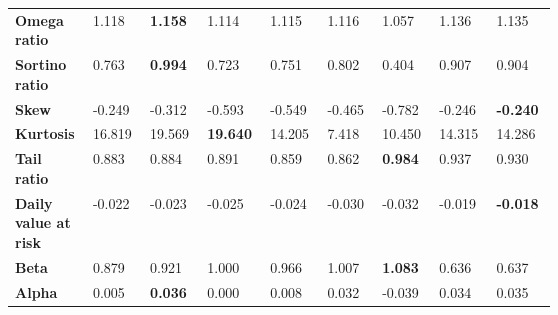 \begin{table}[ht!]
{\begin{tabular}{*{9}{|m{0.07\linewidth}|}}
                      \bfseries Omega ratio         & 1.118              & \color[HTML]{00F000} \bfseries 1.158 & 1.114                                 & 1.115            & 1.116 & 1.057 & 1.136 & 1.135 \\[0.5cm]
                      \bfseries Sortino ratio       & 0.763              & \color[HTML]{00F000} \bfseries 0.994 & 0.723                                 & 0.751            & 0.802 & 0.404 & 0.907 & 0.904 \\[0.5cm]
                      \bfseries Skew                & -0.249             & -0.312                               & -0.593                                & -0.549           & -0.465           & -0.782                               & -0.246                               & \color[HTML]{00F000} \bfseries -0.240 \\[0.5cm]
                      \bfseries Kurtosis            & 16.819             & 19.569                               & \color[HTML]{00F000} \bfseries 19.640 & 14.205           & 7.418 & 10.450 & 14.315 & 14.286 \\[0.5cm]
                      \bfseries Tail ratio          & 0.883              & 0.884                                & 0.891                                 & 0.859            & 0.862            & \color[HTML]{00F000} \bfseries 0.984 & 0.937 & 0.930 \\[0.5cm]
                      \bfseries Daily value at risk & -0.022             & -0.023                               & -0.025                                & -0.024           & -0.030           & -0.032                               & -0.019                               & \color[HTML]{00F000} \bfseries -0.018 \\[0.5cm]
                      \bfseries Beta                & 0.879              & 0.921                                & 1.000                                 & 0.966            & 1.007            & \color[HTML]{00F000} \bfseries 1.083 & 0.636 & 0.637 \\[0.5cm]
                      \bfseries Alpha               & 0.005              & \color[HTML]{00F000} \bfseries 0.036 & 0.000                                 & 0.008            & 0.032            & -0.039 & 0.034 & 0.035 \\[0.5cm]
                      \bottomrule
    \end{tabular}}
\end{table}
